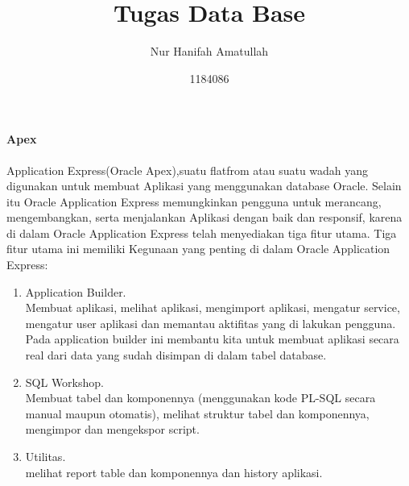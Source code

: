 \documentclass[a4paper,12pt]{report}
\title{Tugas Data Base}
\author{Nur Hanifah Amatullah}
\date{1184086}
\begin{document}
\maketitle
\paragraph{Apex}
Application Express(Oracle Apex),suatu flatfrom atau suatu wadah yang digunakan untuk membuat Aplikasi yang menggunakan database Oracle. Selain itu Oracle Application Express memungkinkan pengguna untuk merancang, mengembangkan, serta menjalankan Aplikasi dengan baik dan responsif, karena di dalam Oracle Application Express telah menyediakan tiga fitur utama. Tiga fitur utama ini memiliki Kegunaan yang penting di dalam Oracle Application Express:\\
\begin{enumerate}
\item  Application Builder.\\
Membuat aplikasi, melihat aplikasi, mengimport aplikasi, mengatur service, mengatur user aplikasi dan memantau aktifitas yang di lakukan pengguna. Pada application builder ini membantu kita untuk membuat aplikasi secara real dari data yang sudah disimpan di dalam tabel database.\\
\item  SQL Workshop.\\
Membuat tabel dan komponennya (menggunakan kode PL-SQL secara manual maupun otomatis), melihat struktur tabel dan komponennya, mengimpor dan mengekspor script.\\
\item Utilitas.\\
melihat report table dan komponennya dan history aplikasi.\\
\end{enumerate}
\end{document}
